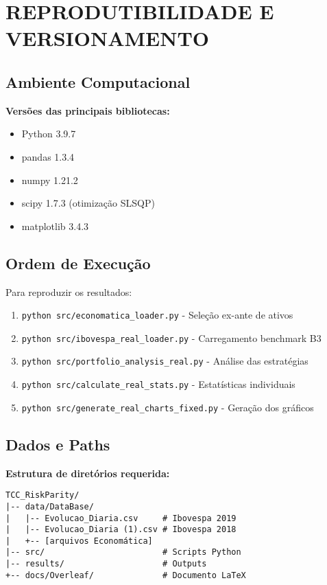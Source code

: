 \section{REPRODUTIBILIDADE E VERSIONAMENTO}

\subsection{Ambiente Computacional}

\textbf{Versões das principais bibliotecas:}
\begin{itemize}
    \item Python 3.9.7
    \item pandas 1.3.4  
    \item numpy 1.21.2
    \item scipy 1.7.3 (otimização SLSQP)
    \item matplotlib 3.4.3
\end{itemize}

\subsection{Ordem de Execução}

Para reproduzir os resultados:

\begin{enumerate}
    \item \texttt{python src/economatica\_loader.py} - Seleção ex-ante de ativos
    \item \texttt{python src/ibovespa\_real\_loader.py} - Carregamento benchmark B3
    \item \texttt{python src/portfolio\_analysis\_real.py} - Análise das estratégias
    \item \texttt{python src/calculate\_real\_stats.py} - Estatísticas individuais
    \item \texttt{python src/generate\_real\_charts\_fixed.py} - Geração dos gráficos
\end{enumerate}

\subsection{Dados e Paths}

\textbf{Estrutura de diretórios requerida:}
\begin{verbatim}
TCC_RiskParity/
|-- data/DataBase/
|   |-- Evolucao_Diaria.csv     # Ibovespa 2019
|   |-- Evolucao_Diaria (1).csv # Ibovespa 2018  
|   +-- [arquivos Economática]
|-- src/                        # Scripts Python
|-- results/                    # Outputs
+-- docs/Overleaf/              # Documento LaTeX
\end{verbatim}

